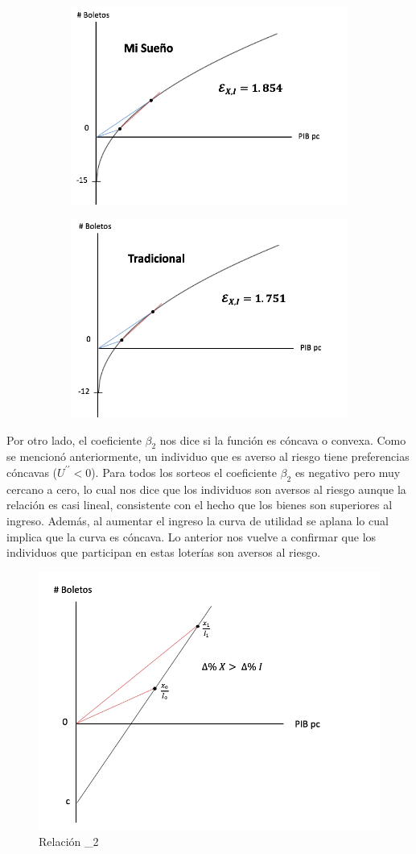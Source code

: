 \begin{figure}[H]
\centering
\begin{subfigure}
  \centering
  \includegraphics[width=.45\linewidth]{Imagenes/suen.png}
\end{subfigure}%
\begin{subfigure}
  \centering
  \includegraphics[width=.45\linewidth]{Imagenes/trad.png}
\end{subfigure}
\end{figure}

\newpage

Por otro lado, el coeficiente $\beta_2$ nos dice si la función es cóncava o convexa. Como se mencionó anteriormente, un individuo que es averso al riesgo tiene preferencias cóncavas ($U^{\prime \prime} < 0$). Para todos los sorteos el coeficiente $\beta_2$ es negativo pero muy cercano a cero, lo cual nos dice que los individuos son aversos al riesgo aunque la relación es casi lineal, consistente con el hecho que los bienes son superiores al ingreso. Además, al aumentar el ingreso la curva de utilidad se aplana lo cual implica que la curva es cóncava. Lo anterior nos vuelve a confirmar que los individuos que participan en estas loterías son aversos al riesgo. \\

\begin{figure}[H]
    \centering
    \caption{Relación \beta_2}
    \label{fig:my_label}
    \includegraphics[width=.85\linewidth]{Imagenes/sorteo_gen2.png}
\end{figure} \\

